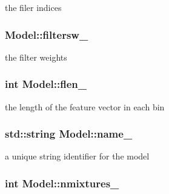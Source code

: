 the filer indices 

\hypertarget{classModel_ac8594fac5ef6d874cf0a4f2fd856914d}{
\subsubsection[{filtersw\-\_\-}]{ Model\-::filtersw\-\_\-\hspace{0.3cm}{\ttfamily [protected]}}}\label{classModel_ac8594fac5ef6d874cf0a4f2fd856914d}


the filter weights 

\hypertarget{classModel_afafec86aa7175a4664ae76d545f084ea}{
\subsubsection[{flen\-\_\-}]{\setlength{\rightskip}{0pt plus 5cm}int Model\-::flen\-\_\-\hspace{0.3cm}{\ttfamily [protected]}}}\label{classModel_afafec86aa7175a4664ae76d545f084ea}


the length of the feature vector in each bin 

\hypertarget{classModel_afca3bde5ad33e936c455d3d311b8406d}{
\subsubsection[{name\-\_\-}]{\setlength{\rightskip}{0pt plus 5cm}std\-::string Model\-::name\-\_\-\hspace{0.3cm}{\ttfamily [protected]}}}\label{classModel_afca3bde5ad33e936c455d3d311b8406d}


a unique string identifier for the model 

\hypertarget{classModel_a047a8d7591bde166f0c3ab36a2130b53}{
\subsubsection[{nmixtures\-\_\-}]{\setlength{\rightskip}{0pt plus 5cm}int Model\-::nmixtures\-\_\-\hspace{0.3cm}{\ttfamily [protected]}}}\label{classModel_a047a8d7591bde166f0c3ab36a2130b53}


